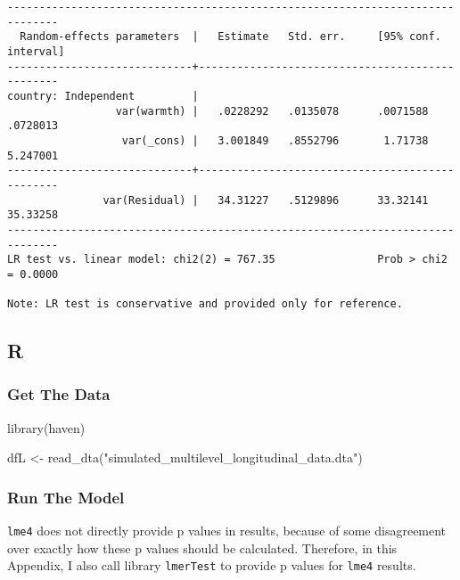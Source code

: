 \documentclass[
  letterpaper,
  DIV=11,
  numbers=noendperiod]{scrreprt}
\newenvironment{Shaded}{\begin{snugshade}}{\end{snugshade}}
\newcommand{\FunctionTok}[1]{\textcolor[rgb]{0.28,0.35,0.67}{#1}}
\newcommand{\NormalTok}[1]{\textcolor[rgb]{0.00,0.23,0.31}{#1}}
\newcommand{\OtherTok}[1]{\textcolor[rgb]{0.00,0.23,0.31}{#1}}
\newcommand{\StringTok}[1]{\textcolor[rgb]{0.13,0.47,0.30}{#1}}
\begin{document}
\begin{verbatim}
------------------------------------------------------------------------------
  Random-effects parameters  |   Estimate   Std. err.     [95% conf. interval]
-----------------------------+------------------------------------------------
country: Independent         |
                 var(warmth) |   .0228292   .0135078      .0071588    .0728013
                  var(_cons) |   3.001849   .8552796       1.71738    5.247001
-----------------------------+------------------------------------------------
               var(Residual) |   34.31227   .5129896      33.32141    35.33258
------------------------------------------------------------------------------
LR test vs. linear model: chi2(2) = 767.35                Prob > chi2 = 0.0000

Note: LR test is conservative and provided only for reference.
\end{verbatim}

\subsection{R}

\subsubsection{Get The Data}\label{get-the-data-4}

\begin{Shaded}
\begin{Highlighting}[]
\FunctionTok{library}\NormalTok{(haven)}

\NormalTok{dfL }\OtherTok{\textless{}{-}} \FunctionTok{read\_dta}\NormalTok{(}\StringTok{"simulated\_multilevel\_longitudinal\_data.dta"}\NormalTok{)}
\end{Highlighting}
\end{Shaded}

\subsubsection{Run The Model}\label{run-the-model-4}

\begin{tcolorbox}[enhanced jigsaw, bottomtitle=1mm, opacitybacktitle=0.6, title=\textcolor{quarto-callout-caution-color}{\faFire}\hspace{0.5em}{Caution}, opacityback=0, titlerule=0mm, toprule=.15mm, breakable, colframe=quarto-callout-caution-color-frame, rightrule=.15mm, coltitle=black, colback=white, toptitle=1mm, arc=.35mm, left=2mm, leftrule=.75mm, bottomrule=.15mm, colbacktitle=quarto-callout-caution-color!10!white]

\texttt{lme4} does not directly provide p values in results, because of
some disagreement over exactly how these p values should be calculated.
Therefore, in this Appendix, I also call library \texttt{lmerTest} to
provide p values for \texttt{lme4} results.

\end{tcolorbox}
\end{document}
